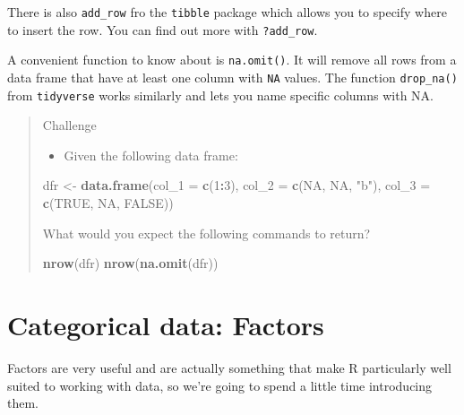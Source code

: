 \documentclass[
]{book}
\newenvironment{Shaded}{\begin{snugshade}}{\end{snugshade}}
\newcommand{\AttributeTok}[1]{\textcolor[rgb]{0.13,0.29,0.53}{#1}}
\newcommand{\ConstantTok}[1]{\textcolor[rgb]{0.56,0.35,0.01}{#1}}
\newcommand{\DecValTok}[1]{\textcolor[rgb]{0.00,0.00,0.81}{#1}}
\newcommand{\FunctionTok}[1]{\textcolor[rgb]{0.13,0.29,0.53}{\textbf{#1}}}
\newcommand{\NormalTok}[1]{#1}
\newcommand{\OtherTok}[1]{\textcolor[rgb]{0.56,0.35,0.01}{#1}}
\newcommand{\SpecialCharTok}[1]{\textcolor[rgb]{0.81,0.36,0.00}{\textbf{#1}}}
\newcommand{\StringTok}[1]{\textcolor[rgb]{0.31,0.60,0.02}{#1}}
\providecommand{\tightlist}{%
  \setlength{\itemsep}{0pt}\setlength{\parskip}{0pt}}
\begin{document}
There is also \texttt{add\_row} fro the \texttt{tibble} package which allows you to specify where to insert the row. You can find out more with \texttt{?add\_row}.

A convenient function to know about is \texttt{na.omit()}. It will remove all rows from a data frame that have at least one column with \texttt{NA} values. The function \texttt{drop\_na()} from \texttt{tidyverse} works similarly and lets you name specific columns with NA.

\begin{quote}
Challenge

\begin{itemize}
\tightlist
\item
  Given the following data frame:
\end{itemize}

\begin{Shaded}
\begin{Highlighting}[]
\NormalTok{dfr }\OtherTok{\textless{}{-}} \FunctionTok{data.frame}\NormalTok{(}\AttributeTok{col\_1 =} \FunctionTok{c}\NormalTok{(}\DecValTok{1}\SpecialCharTok{:}\DecValTok{3}\NormalTok{), }
                  \AttributeTok{col\_2 =} \FunctionTok{c}\NormalTok{(}\ConstantTok{NA}\NormalTok{, }\ConstantTok{NA}\NormalTok{, }\StringTok{"b"}\NormalTok{), }
                  \AttributeTok{col\_3 =} \FunctionTok{c}\NormalTok{(}\ConstantTok{TRUE}\NormalTok{, }\ConstantTok{NA}\NormalTok{, }\ConstantTok{FALSE}\NormalTok{))}
\end{Highlighting}
\end{Shaded}

What would you expect the following commands to return?

\begin{Shaded}
\begin{Highlighting}[]
\FunctionTok{nrow}\NormalTok{(dfr)}
\FunctionTok{nrow}\NormalTok{(}\FunctionTok{na.omit}\NormalTok{(dfr))}
\end{Highlighting}
\end{Shaded}
\end{quote}

\hypertarget{categorical-data-factors}{%
\section{Categorical data: Factors}\label{categorical-data-factors}}

Factors are very useful and are actually
something that make R particularly well suited to working with data, so we're
going to spend a little time introducing them.
\end{document}
